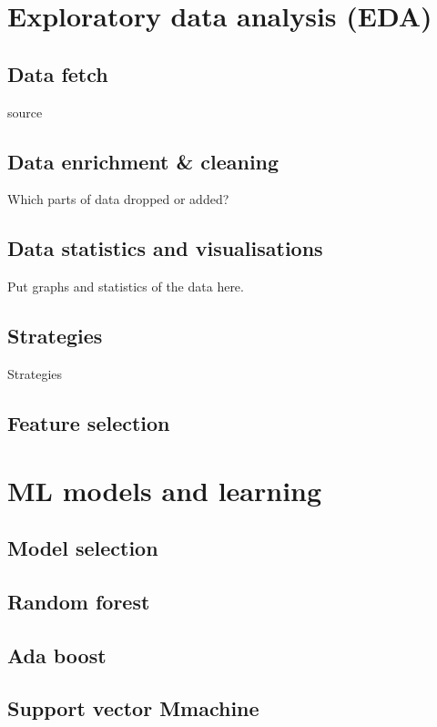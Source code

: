 \documentclass[preprint,aps,nofootinbib,a4paper,superscriptaddress,longbibliography,amsfonts,amssymb,amsmath,titlepage]{revtex4-2}
\begin{document}
\section{Exploratory data analysis (EDA)}


\subsection{Data fetch}
source

\subsection{Data enrichment \& cleaning}
Which parts of data dropped or added?

\subsection{Data statistics and visualisations}
Put graphs and statistics of the data here.

\subsection{Strategies}
Strategies

\subsection{Feature selection}

\section{ML models and learning}


\subsection{Model selection}


\subsection{Random forest}


\subsection{Ada boost}


\subsection{Support vector Mmachine}
\end{document}

